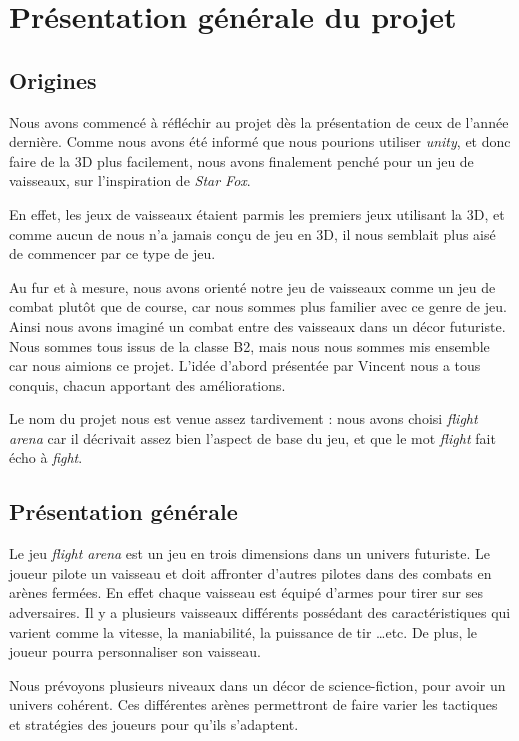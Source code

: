 \documentclass[10pt, titlepage]{report}
\begin{document}
\chapter{Présentation générale du projet}

\section{Origines}
Nous avons commencé à réfléchir au projet dès la présentation de ceux de l'année dernière. Comme nous avons été informé que nous pourions utiliser\emph{ unity}, et donc faire de la 3D plus facilement, nous avons finalement penché pour un jeu de vaisseaux, sur l'inspiration de \emph{Star Fox}.

En effet, les jeux de vaisseaux étaient parmis les premiers jeux utilisant la 3D, et comme aucun de nous n'a jamais conçu de jeu en 3D, il nous semblait plus aisé de commencer par ce type de jeu.

Au fur et à mesure, nous avons orienté notre jeu de vaisseaux comme un jeu de combat plutôt que de course, car nous sommes plus familier avec ce genre de jeu. Ainsi nous avons imaginé un combat entre des vaisseaux dans un décor futuriste.\\

Nous sommes tous issus de la classe B2, mais nous nous sommes mis ensemble car nous aimions ce projet. L'idée d'abord présentée par Vincent nous a tous conquis, chacun apportant des améliorations.

Le nom du projet nous est venue assez tardivement : nous avons choisi \emph{flight arena} car il décrivait assez bien l'aspect de base du jeu, et que le mot \emph{flight} fait écho à \emph{fight}.

\section{Présentation générale}
Le jeu \emph{flight arena} est un jeu en trois dimensions dans un univers futuriste. Le joueur pilote un vaisseau et doit affronter d'autres pilotes dans des combats en arènes fermées. En effet chaque vaisseau est équipé d'armes pour tirer sur ses adversaires. Il y a plusieurs vaisseaux différents possédant des caractéristiques qui varient comme la vitesse, la maniabilité, la puissance de tir \ldots  etc. De plus, le joueur pourra personnaliser son vaisseau.

Nous prévoyons plusieurs niveaux dans un décor de science-fiction, pour avoir un univers cohérent. Ces différentes arènes permettront de faire varier les tactiques et stratégies des joueurs pour qu'ils s'adaptent.
\end{document}
